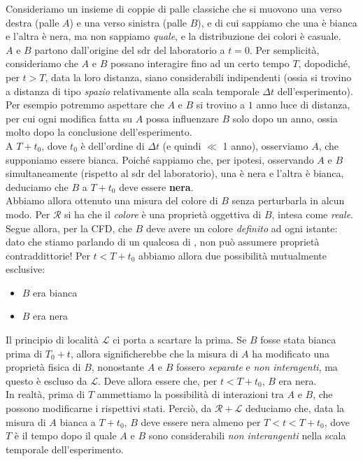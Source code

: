 \documentclass[../../FisicaTeorica.tex]{subfiles}
\begin{document}
Consideriamo un insieme di coppie di palle classiche che si muovono una verso destra (palle $A$) e una verso sinistra (palle $B$), e di cui sappiamo che una è bianca e l'altra è nera, ma non sappiamo \textit{quale}, e la distribuzione dei colori è casuale.\\
$A$ e $B$ partono dall'origine del sdr del laboratorio a $t=0$. Per semplicità, consideriamo che $A$ e $B$ possano interagire fino ad un certo tempo $T$, dopodiché, per $t>T$, data la loro distanza, siano considerabili indipendenti (ossia si trovino a distanza di tipo \textit{spazio} relativamente alla scala temporale $\Delta t$ dell'esperimento). Per esempio potremmo aspettare che $A$ e $B$ si trovino a $1$ anno luce di distanza, per cui ogni modifica fatta su $A$ possa influenzare $B$ solo dopo un anno, ossia molto dopo la conclusione dell'esperimento.\\
A $T+t_0$, dove $t_0$ è dell'ordine di $\Delta t$ (e quindi $\ll$ 1 anno), osserviamo $A$, che supponiamo essere bianca. Poiché sappiamo che, per ipotesi, osservando $A$ e $B$ simultaneamente (rispetto al sdr del laboratorio), una è nera e l'altra è bianca, deduciamo che $B$ a $T+t_0$ deve essere \textbf{nera}.\\
Abbiamo allora ottenuto una misura del colore di $B$ senza perturbarla in alcun modo. Per $\mathcal{R}$ si ha che il \textit{colore} è una proprietà oggettiva di $B$, intesa come \textit{reale}. Segue allora, per la CFD, che $B$ deve avere un colore \textit{definito} ad ogni istante: dato che stiamo parlando di un qualcosa di , non può assumere proprietà contraddittorie!
Per $t<T+t_0$ abbiamo allora due possibilità mutualmente esclusive:
\begin{itemize}
\item $B$ era bianca
\item $B$ era nera
\end{itemize}
Il principio di località $\mathcal{L}$ ci porta a scartare la prima. Se $B$ fosse stata bianca prima di $T_0+t$, allora significherebbe che la misura di $A$ ha modificato una proprietà fisica di $B$, nonostante $A$ e $B$ fossero \textit{separate} e \textit{non interagenti}, ma questo è escluso da $\mathcal{L}$. Deve allora essere che, per $t<T + t_0$, $B$ era nera.\\
In realtà, prima di $T$ ammettiamo la possibilità di interazioni tra $A$ e $B$, che possono modificarne i rispettivi stati. Perciò, da $\mathcal{R} + \mathcal{L}$ deduciamo che, data la misura di $A$ bianca a $T+t_0$, $B$ deve essere nera almeno per $T < t < T+t_0$, dove $T$ è il tempo dopo il quale $A$ e $B$ sono considerabili \textit{non interangenti} nella scala temporale dell'esperimento.\\
\end{document}
